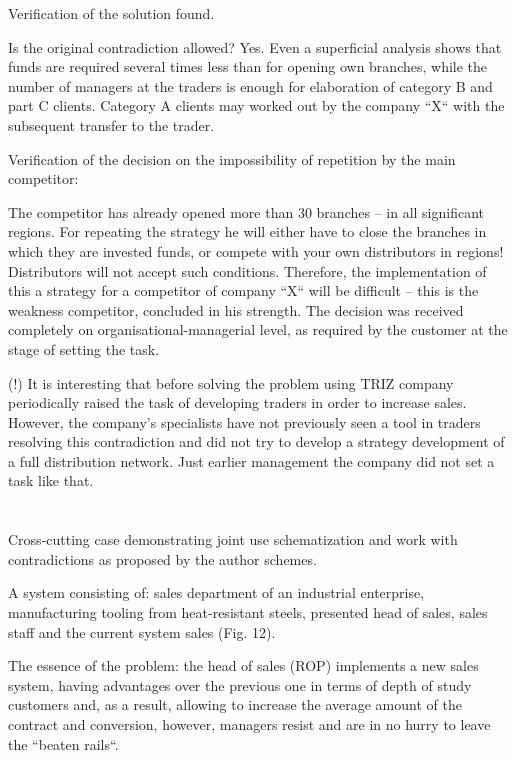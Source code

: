 \documentclass[11pt,a4paper]{book}
\begin{document}
Verification of the solution found.

Is the original contradiction allowed? Yes. Even a superficial analysis shows
that funds are required several times less than for opening own branches,
while the number of managers at the traders is enough for elaboration of
category B and part C clients. Category A clients may worked out by the
company “X“ with the subsequent transfer to the trader.

Verification of the decision on the impossibility of repetition by the main
competitor:

The competitor has already opened more than 30 branches -- in all significant
regions. For repeating the strategy he will either have to close the branches
in which they are invested funds, or compete with your own distributors in
regions! Distributors will not accept such conditions. Therefore, the
implementation of this a strategy for a competitor of company “X“ will be
difficult -- this is the weakness competitor, concluded in his strength. The
decision was received completely on organisational-managerial level, as
required by the customer at the stage of setting the task.

(!) It is interesting that before solving the problem using TRIZ company
periodically raised the task of developing traders in order to increase sales.
However, the company's specialists have not previously seen a tool in traders
resolving this contradiction and did not try to develop a strategy development
of a full distribution network. Just earlier management the company did not
set a task like that.

\chapter{}%

Cross-cutting case demonstrating joint use schematization and work with
contradictions as proposed by the author schemes.

A system consisting of: sales department of an industrial enterprise,
manufacturing tooling from heat-resistant steels, presented head of sales,
sales staff and the current system sales (Fig. 12).

The essence of the problem: the head of sales (ROP) implements a new sales
system, having advantages over the previous one in terms of depth of study
customers and, as a result, allowing to increase the average amount of the
contract and conversion, however, managers resist and are in no hurry to leave
the “beaten rails“.
\end{document}
